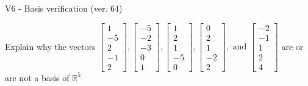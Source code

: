 \begin{exercise}
  \begin{exerciseTitle}V6 - Basis verification (ver. 64)\end{exerciseTitle}
  \begin{exerciseStatement}
    Explain why the vectors \(\left[\begin{array}{r}
1 \\
-5 \\
2 \\
-1 \\
2
\end{array}\right] , \left[\begin{array}{r}
-5 \\
-2 \\
-3 \\
0 \\
1
\end{array}\right] , \left[\begin{array}{r}
1 \\
2 \\
1 \\
-5 \\
0
\end{array}\right] , \left[\begin{array}{r}
0 \\
2 \\
1 \\
-2 \\
2
\end{array}\right] , \text{ and } \left[\begin{array}{r}
-2 \\
-1 \\
1 \\
2 \\
4
\end{array}\right]\) are or are not a basis of \(\mathbb{R}^5\)	



\end{exerciseStatement}
\end{exercise}
